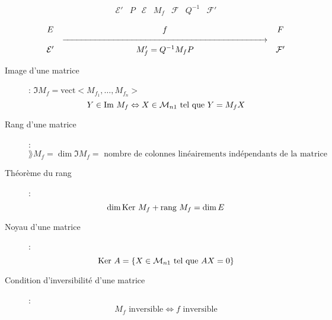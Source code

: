 \begin{description}
\[\begin{matrix}
        \mathcal{E'} & P & \mathcal{E} & M_f & \mathcal{F} & Q^{-1} & \mathcal{F'}\\
    \end{matrix}\]
    \[\begin{matrix}
        E & f & F\\
        & \xrightarrow{\makebox[8.5cm]{}} & \\
        \mathcal{E'} & M_f'=Q^{-1}M_fP & \mathcal{F'}
    \end{matrix}\]
\item[Image d'une matrice] : $\Im M_f=\textrm{vect}<M_{f_1},\dots,M_{f_n}>$
    \[ Y\in\textrm{Im } M_f\Leftrightarrow X\in\mathcal M_{n1}\textrm{ tel que } Y=M_fX \]
\item[Rang d'une matrice] :
    \[
        \rang M_f=\dim\Im M_f=\textrm{ nombre de colonnes linéairements indépendants de la matrice}
    \]
\item[Théorème du rang]:
    \[ \dim\textrm{Ker } M_f+\textrm{rang } M_f=\dim E \]
\item[Noyau d'une matrice] :
    \[ \textrm{Ker } A=\{X\in\mathcal M_{n1}\textrm{ tel que } AX=0 \} \]
\item[Condition d'inversibilité d'une matrice] :
    \[
        M_f\textrm{ inversible}
        \Leftrightarrow
        f\textrm{ inversible}
    \]
\end{description}